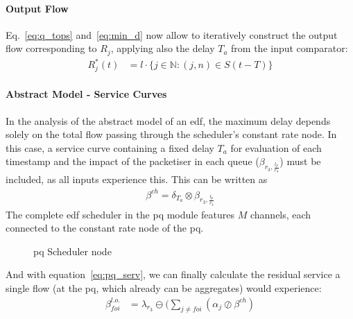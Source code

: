\paragraph{Output Flow}
Eq.~\ref{eq:q_tops} and~\ref{eq:min_d} now allow to iteratively construct the output flow corresponding to $R_j$,
applying also the delay $T_a$ from the input comparator:
%
\begin{equation}
\begin{aligned}
R_j^*(t) &= l \cdot \{ j \in \mathbb{N} : (j,n) \in S(t-T) \}
\label{eq:ch_serv}
\end{aligned}
\end{equation}
%

\fi

\paragraph{Abstract Model - Service Curves}

In the analysis of the abstract model of an \gls{edf}, the maximum delay depends solely on the total flow passing through the scheduler's constant rate node.
In this case, a service curve containing a fixed delay $T_a$ for evaluation of each timestamp and the impact of the packetiser in each queue ($\beta_{r_3, \frac{l_p}{r_3}}$) must be
included, as all inputs experience this. This can be written as
\begin{equation}
\begin{aligned}
\beta^{ch} = \delta_{T_a} \otimes \beta_{r_3, \frac{l_p}{r_3}}
\label{eq:pq_serv}
\end{aligned}
\end{equation}
%
The complete \gls{edf} scheduler in the \gls{pq} module features $M$ channels, each connected to the constant rate node of the \gls{pq}.
%
\begin{figure}[H]
  \centering
  \def\svgwidth{0.55\textwidth}
  
  \caption{\gls{pq} Scheduler node}
  \label{fig:pq-edf}
\end{figure}
\noindent
And with equation~\ref{eq:pq_serv}, we can finally calculate the residual service a single flow (at the \gls{pq}, which already can be aggregates) would experience:
%
\begin{equation}
\begin{aligned}
\beta_{foi}^{l.o.} &= \lambda_{r_3} \ominus ( \sum_{j \neq foi} (\alpha_j \oslash \beta^{ch})\\
\label{eq:foi_serv}
\end{aligned}
\end{equation}


